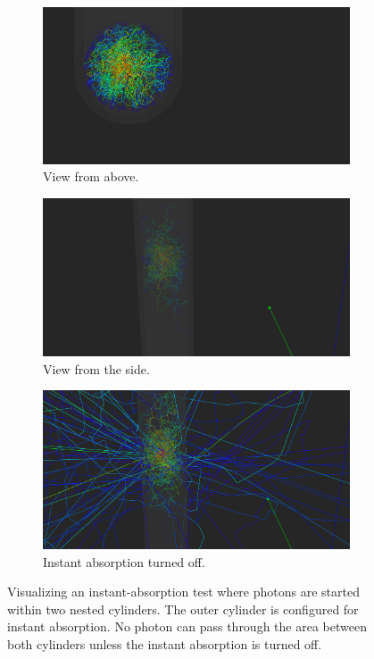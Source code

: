 \begin{figure}[htbp]
  \begin{subfigure}{.32\linewidth}
    \includegraphics[width=\textwidth, trim={0 3cm 16cm 0}, clip]{img/instant-absorption-steamshovel-sahmoo8O-above}
    \caption{View from above.}
  \end{subfigure}
  \begin{subfigure}{.32\linewidth}
    \includegraphics[width=\textwidth, trim={6cm 4cm 13cm 1.5cm}, clip]{img/instant-absorption-steamshovel-sahmoo8O-3d}
    \caption{View from the side.}
  \end{subfigure}
  \begin{subfigure}{.32\linewidth}
    \includegraphics[width=\textwidth, trim={6cm 4cm 13cm 1.5cm}, clip]{img/instant-absorption-steamshovel-sahmoo8O-turned-off}
    \caption{Instant absorption turned off.}
  \end{subfigure}
  \caption{Visualizing an instant-absorption test where photons are started within two nested cylinders. The outer cylinder is configured for instant absorption. No photon can pass through the area between both cylinders unless the instant absorption is turned off.}
  \label{fig:sahmoo8O}
\end{figure}


